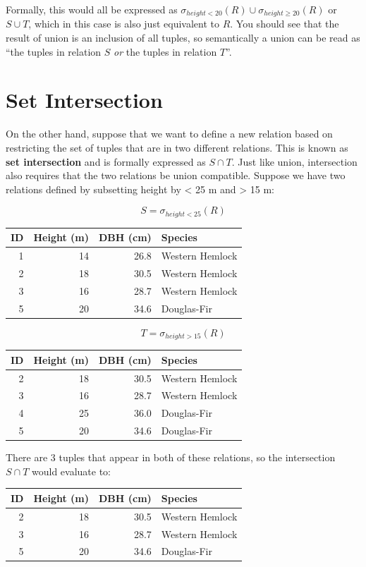 \documentclass[
]{book}
\begin{document}
Formally, this would all be expressed as \(σ_{height<20}(R)∪σ_{height≥20}(R)\) or \(S∪T\), which in this case is also just equivalent to \(R\). You should see that the result of union is an inclusion of all tuples, so semantically a union can be read as ``the tuples in relation \(S\) \emph{or} the tuples in relation \(T\)''.

\section{Set Intersection}\label{set-intersection}

On the other hand, suppose that we want to define a new relation based on restricting the set of tuples that are in two different relations. This is known as \textbf{set intersection} and is formally expressed as \(S∩T\). Just like union, intersection also requires that the two relations be union compatible. Suppose we have two relations defined by subsetting height by \textless{} 25 m and \textgreater{} 15 m:

\[S = σ_{height<25}(R)\]

\begin{tabular}{rrrl}
\toprule
ID & Height (m) & DBH (cm) & Species\\
\midrule
1 & 14 & 26.8 & Western Hemlock\\
2 & 18 & 30.5 & Western Hemlock\\
3 & 16 & 28.7 & Western Hemlock\\
5 & 20 & 34.6 & Douglas-Fir\\
\bottomrule
\end{tabular}

\[T = σ_{height>15}(R)\]

\begin{tabular}{rrrl}
\toprule
ID & Height (m) & DBH (cm) & Species\\
\midrule
2 & 18 & 30.5 & Western Hemlock\\
3 & 16 & 28.7 & Western Hemlock\\
4 & 25 & 36.0 & Douglas-Fir\\
5 & 20 & 34.6 & Douglas-Fir\\
\bottomrule
\end{tabular}

There are 3 tuples that appear in both of these relations, so the intersection \(S∩T\) would evaluate to:

\begin{tabular}{rrrl}
\toprule
ID & Height (m) & DBH (cm) & Species\\
\midrule
2 & 18 & 30.5 & Western Hemlock\\
3 & 16 & 28.7 & Western Hemlock\\
5 & 20 & 34.6 & Douglas-Fir\\
\bottomrule
\end{tabular}
\end{document}
